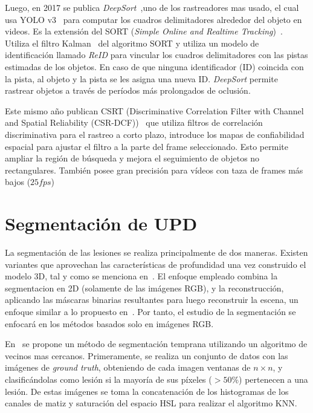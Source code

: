 Luego, en 2017 se publica \textit{DeepSort}~\cite{wojke2017simple},uno de los rastreadores mas usado, el cual usa YOLO v3~\cite{redmon2018yolov3} para computar los cuadros delimitadores alrededor del objeto en videos. Es la extensión del  SORT (\textit{Simple Online and Realtime Tracking})~\cite{bewley2016simple}. Utiliza el filtro Kalman~\cite{welch1995introduction} del algoritmo SORT y utiliza un modelo de identificación llamado \textit{ReID} para vincular los cuadros delimitadores con las pistas estimadas de los objetos. En caso de que ninguna identificador (ID) coincida con la pista, al objeto y la pista se les asigna una nueva ID. \textit{DeepSort} permite rastrear objetos a través de períodos más prolongados de oclusión.

Este mismo año publican CSRT (Discriminative Correlation Filter with Channel and Spatial Reliability (CSR-DCF))~\cite{lunevzivc2018discriminative} que utiliza filtros de correlación discriminativa para el rastreo a corto plazo, introduce los mapas de confiabilidad espacial para ajustar el filtro a la parte del frame seleccionado. Esto permite ampliar la región de búsqueda y mejora el seguimiento de objetos no rectangulares. También posee gran precisión para vídeos con taza de frames más bajos ($25 fps$)

\section{Segmentación de UPD}

La segmentación de las lesiones se realiza principalmente de dos maneras. Existen variantes que aprovechan las características de profundidad una vez construido el modelo 3D, tal y como se menciona en~\cite{filko2018wound}. El enfoque empleado combina la segmentacion en 2D (solamente de las imágenes RGB), y la reconstrucción, aplicando las máscaras binarias resultantes para luego reconstruir la escena, un enfoque similar a lo propuesto en~\cite{mirzaalian2019measuring}. Por tanto, el estudio de la segmentación se enfocará en los métodos basados solo en imágenes RGB.

En~\cite{filko2018wound} se propone un método de segmentación temprana utilizando un algoritmo de vecinos mas cercanos.  Primeramente, se realiza un conjunto de datos con las imágenes de \textit{ground truth}, obteniendo de cada imagen ventanas de $n \times n$, y clasificándolas como lesión si la mayoría de sus píxeles ($> 50 \%$) pertenecen a una lesión. De estas imágenes se toma la concatenación de los histogramas de los canales de matiz y saturación del espacio HSL para realizar el algoritmo KNN.


